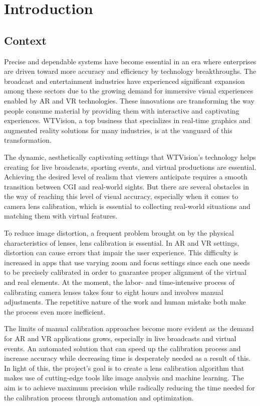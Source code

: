 \chapter{Introduction}\label{chap:intro}

\section{Context}\label{sec:context}

\noindent Precise and dependable systems have become essential in an era where enterprises are driven toward more accuracy and efficiency by technology breakthroughs. The broadcast and entertainment industries have experienced significant expansion among these sectors due to the growing demand for immersive visual experiences enabled by \ac{AR} and \ac{VR} technologies. These innovations are transforming the way people consume material by providing them with interactive and captivating experiences. WTVision, a top business that specializes in real-time graphics and augmented reality solutions for many industries, is at the vanguard of this transformation.


\noindent The dynamic, aesthetically captivating settings that WTVision's technology helps creating for live broadcasts, sporting events, and virtual productions are essential. Achieving the desired level of realism that viewers anticipate requires a smooth transition between \ac{CGI} and real-world sights. But there are several obstacles in the way of reaching this level of visual accuracy, especially when it comes to camera lens calibration, which is essential to collecting real-world situations and matching them with virtual features.


\noindent To reduce image distortion, a frequent problem brought on by the physical characteristics of lenses, lens calibration is essential. In AR and VR settings, distortion can cause errors that impair the user experience. This difficulty is increased in apps that use varying zoom and focus settings since each one needs to be precisely calibrated in order to guarantee proper alignment of the virtual and real elements. At the moment, the labor- and time-intensive process of calibrating camera lenses takes four to eight hours and involves manual adjustments. The repetitive nature of the work and human mistake both make the process even more inefficient.


\noindent The limits of manual calibration approaches become more evident as the demand for AR and VR applications grows, especially in live broadcasts and virtual events. An automated solution that can speed up the calibration process and increase accuracy while decreasing time is desperately needed as a result of this. In light of this, the project's goal is to create a lens calibration algorithm that makes use of cutting-edge tools like image analysis and machine learning. The aim is to achieve maximum precision while radically reducing the time needed for the calibration process through automation and optimization.



